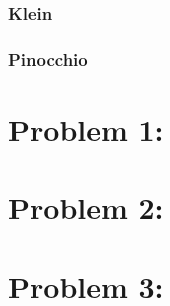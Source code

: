 \subsubsection{Klein}
\subsubsection{Pinocchio}


\section{Problem 1: }


\section{Problem 2: }


\section{Problem 3: }


